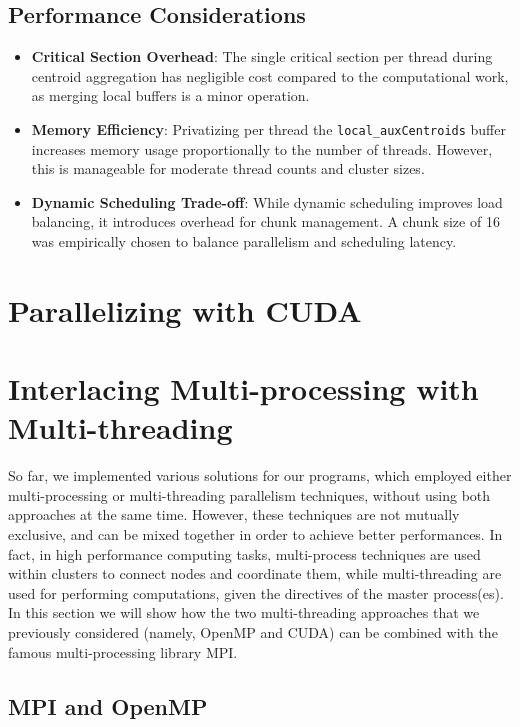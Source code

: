 \documentclass[11pt, journal]{IEEEtran}
\begin{document}
\subsection{Performance Considerations}

\begin{itemize}
    \item \textbf{Critical Section Overhead}: The single critical section per thread during centroid aggregation has negligible cost compared to the computational work, as merging local buffers is a minor operation.
    \item \textbf{Memory Efficiency}: Privatizing per thread the \texttt{local\_auxCentroids} buffer increases memory usage proportionally to the number of threads. However, this is manageable for moderate thread counts and cluster sizes.
    \item \textbf{Dynamic Scheduling Trade-off}: While dynamic scheduling improves load balancing, it introduces overhead for chunk management. A chunk size of 16 was empirically chosen to balance parallelism and scheduling latency.
\end{itemize}

\section{Parallelizing with CUDA}

\section{Interlacing Multi-processing with Multi-threading}

So far, we implemented various solutions for our programs, which employed either multi-processing or multi-threading parallelism techniques, without using both approaches at the same time. However, these techniques are not mutually exclusive, and can be mixed together in order to achieve better performances. In fact, in high performance computing tasks, multi-process techniques are used within clusters to connect nodes and coordinate them, while multi-threading are used for performing computations, given the directives of the master process(es). In this section we will show how the two multi-threading approaches that we previously considered (namely, OpenMP and CUDA) can be combined with the famous multi-processing library MPI.

\subsection{MPI and OpenMP}
\end{document}

